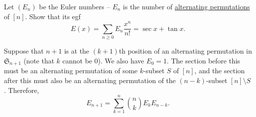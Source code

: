 		\begin{problem}
			Let $(E_n)$ be the Euler numbers -- $E_n$ is the number of \href{https://en.wikipedia.org/wiki/Alternating_permutation}{alternating permutations} of $[n]$. Show that its egf
			\[ E(x) = \sum_{n \ge 0} E_n \frac{x^n}{n!} = \sec x + \tan x. \]
		\end{problem}
		\begin{solution*}
			Suppose that $n+1$ is at the $(k+1)$th position of an alternating permutation in $\mathfrak{S}_{n+1}$ (note that $k$ cannot be $0$). We also have $E_0 = 1$. The section before this must be an alternating permutation of some $k$-subset $S$ of $[n]$, and the section after this must also be an alternating permutation of the $(n-k)$-subset $[n] \setminus S$. Therefore,
			\[ E_{n+1} = \sum_{k=1}^{n} \binom{n}{k} E_k E_{n-k}. \]
		\end{solution*}

